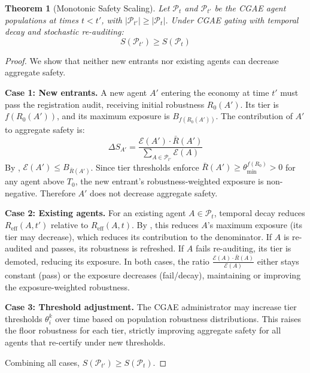 \documentclass[11pt,a4paper]{article}
\newtheorem{theorem}{Theorem}
\begin{document}
\begin{theorem}[Monotonic Safety Scaling]
\label{thm:scaling}
Let $\mathcal{P}_t$ and $\mathcal{P}_{t'}$ be the CGAE agent populations at times $t < t'$, with $|\mathcal{P}_{t'}| \geq |\mathcal{P}_t|$. Under CGAE gating with temporal decay and stochastic re-auditing:
\begin{equation}
  S(\mathcal{P}_{t'}) \geq S(\mathcal{P}_t)
\end{equation}
\end{theorem}

\begin{proof}
We show that neither new entrants nor existing agents can decrease aggregate safety.

\textbf{Case 1: New entrants.} A new agent $A'$ entering the economy at time $t'$ must pass the registration audit, receiving initial robustness $R_0(A')$. Its tier is $f(R_0(A'))$, and its maximum exposure is $B_{f(R_0(A'))}$. The contribution of $A'$ to aggregate safety is:
\begin{equation}
  \Delta S_{A'} = \frac{\mathcal{E}(A') \cdot \bar{R}(A')}{\sum_{A \in \mathcal{P}_{t'}} \mathcal{E}(A)}
\end{equation}
By , $\mathcal{E}(A') \leq B_{\bar{R}(A')}$. Since tier thresholds enforce $\bar{R}(A') \geq \theta_{\min}^{f(R_0)} > 0$ for any agent above $T_0$, the new entrant's robustness-weighted exposure is non-negative. Therefore $A'$ does not decrease aggregate safety.

\textbf{Case 2: Existing agents.} For an existing agent $A \in \mathcal{P}_t$, temporal decay reduces $R_{\text{eff}}(A, t')$ relative to $R_{\text{eff}}(A, t)$. By , this reduces $A$'s maximum exposure (its tier may decrease), which reduces its contribution to the denominator. If $A$ is re-audited and passes, its robustness is refreshed. If $A$ fails re-auditing, its tier is demoted, reducing its exposure. In both cases, the ratio $\frac{\mathcal{E}(A) \cdot \bar{R}(A)}{\mathcal{E}(A)}$ either stays constant (pass) or the exposure decreases (fail/decay), maintaining or improving the exposure-weighted robustness.

\textbf{Case 3: Threshold adjustment.} The CGAE administrator may increase tier thresholds $\theta_i^k$ over time based on population robustness distributions. This raises the floor robustness for each tier, strictly improving aggregate safety for all agents that re-certify under new thresholds.

Combining all cases, $S(\mathcal{P}_{t'}) \geq S(\mathcal{P}_t)$.
\end{proof}
\end{document}
